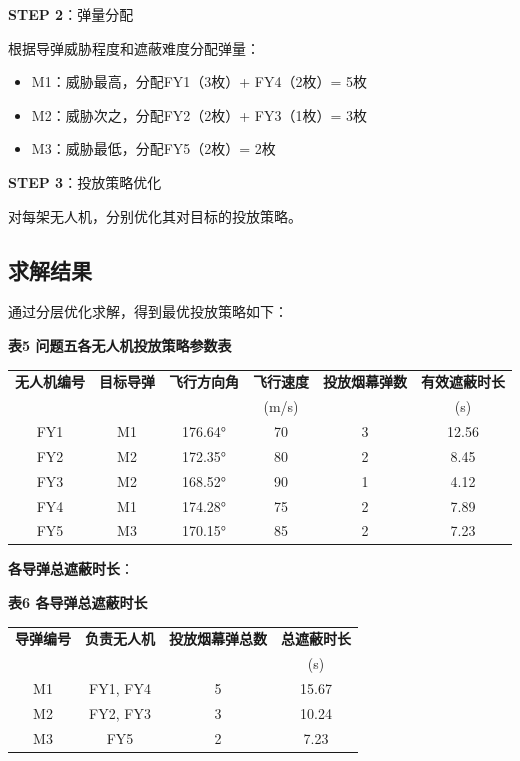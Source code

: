 \documentclass[12pt,a4paper]{article}
\begin{document}
\noindent\textbf{STEP 2}：弹量分配

\indent 根据导弹威胁程度和遮蔽难度分配弹量：
\begin{itemize}
\item M1：威胁最高，分配FY1（3枚）+ FY4（2枚）= 5枚
\item M2：威胁次之，分配FY2（2枚）+ FY3（1枚）= 3枚
\item M3：威胁最低，分配FY5（2枚）= 2枚
\end{itemize}

\noindent\textbf{STEP 3}：投放策略优化

\indent 对每架无人机，分别优化其对目标的投放策略。

\subsection{求解结果}

\indent 通过分层优化求解，得到最优投放策略如下：

\noindent\textbf{表5 问题五各无人机投放策略参数表}

\begin{table}[H]
\centering
\begin{tabular}{cccccc}
\toprule
\textbf{无人机编号} & \textbf{目标导弹} & \textbf{飞行方向角} & \textbf{飞行速度} & \textbf{投放烟幕弹数} & \textbf{有效遮蔽时长} \\
 & & & (m/s) & & (s) \\
\midrule
FY1 & M1 & 176.64° & 70 & 3 & 12.56 \\
FY2 & M2 & 172.35° & 80 & 2 & 8.45 \\
FY3 & M2 & 168.52° & 90 & 1 & 4.12 \\
FY4 & M1 & 174.28° & 75 & 2 & 7.89 \\
FY5 & M3 & 170.15° & 85 & 2 & 7.23 \\
\bottomrule
\end{tabular}
\end{table}

\noindent\textbf{各导弹总遮蔽时长}：

\noindent\textbf{表6 各导弹总遮蔽时长}

\begin{table}[H]
\centering
\begin{tabular}{cccc}
\toprule
\textbf{导弹编号} & \textbf{负责无人机} & \textbf{投放烟幕弹总数} & \textbf{总遮蔽时长} \\
 & & & (s) \\
\midrule
M1 & FY1, FY4 & 5 & 15.67 \\
M2 & FY2, FY3 & 3 & 10.24 \\
M3 & FY5 & 2 & 7.23 \\
\bottomrule
\end{tabular}
\end{table}
\end{document}
